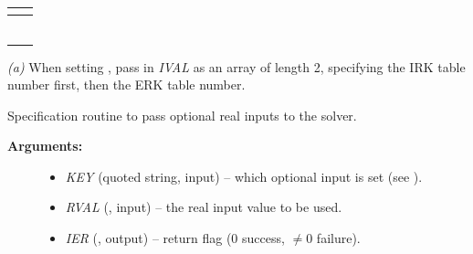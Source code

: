 \documentclass[letterpaper,10pt,english]{sphinxmanual}
\begin{document}
\begin{tabulary}{\linewidth}{|L|L|}
\\
\hline
{}
 & 
{\hyperref[c_interface/User_callable:c.ARKodeSetMaxHnilWarns]{\emph{}}}
\\
\hline
{}
 & 
{\hyperref[c_interface/User_callable:c.ARKodeSetPredictorMethod]{\emph{}}}
\\
\hline
{}
 & 
{\hyperref[c_interface/User_callable:c.ARKodeSetMaxErrTestFails]{\emph{}}}
\\
\hline
{}
 & 
{\hyperref[c_interface/User_callable:c.ARKodeSetMaxConvFails]{\emph{}}}
\\
\hline
{}
 & 
{\hyperref[c_interface/User_callable:c.ARKodeSetMaxNonlinIters]{\emph{}}}
\\
\hline
{}
 & 
{\hyperref[c_interface/User_callable:c.ARKodeSetSmallNumEFails]{\emph{}}}
\\
\hline
{}
 & 
{\hyperref[c_interface/User_callable:c.ARKodeSetMaxStepsBetweenLSet]{\emph{}}}
\\
\hline\end{tabulary}


\emph{(a)} When setting , pass in \emph{IVAL} as an array of
length 2, specifying the IRK table number first, then the ERK table
number.

\begin{fulllineitems}
\label{f_interface/Usage:f/_/FARKSETRIN}
Specification routine to pass optional real inputs
to the {\hyperref[f_interface/Usage:f/_/FARKODE]{\emph{}}} solver.
\begin{description}
\item[{\textbf{Arguments:}}] \leavevmode\begin{itemize}
\item {} 
\emph{KEY} (quoted string, input) -- which optional input
is set (see {\hyperref[f_interface/Usage:finterface-rinoptiontable]{\emph{}}}).

\item {} 
\emph{RVAL} (, input) -- the real input value to be used.

\item {} 
\emph{IER} (, output) -- return flag (0 success, \(\ne 0\) failure).

\end{itemize}

\end{description}

\end{fulllineitems}
\end{document}
